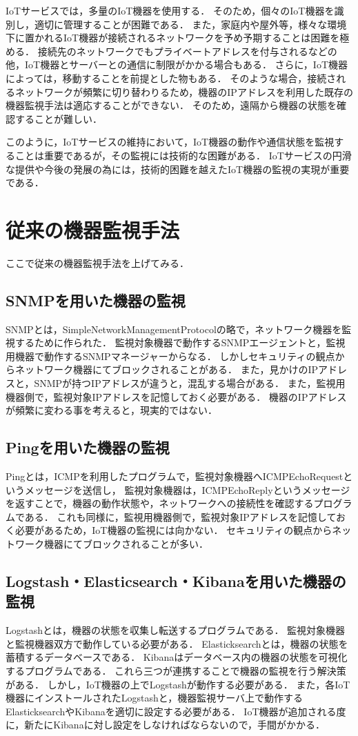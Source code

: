 IoTサービスでは，多量のIoT機器を使用する．
そのため，個々のIoT機器を識別し，適切に管理することが困難である．
また，家庭内や屋外等，様々な環境下に置かれるIoT機器が接続されるネットワークを予め予期することは困難を極める．
接続先のネットワークでもプライベートアドレスを付与されるなどの他，IoT機器とサーバーとの通信に制限がかかる場合もある．
さらに，IoT機器によっては，移動することを前提とした物もある．
そのような場合，接続されるネットワークが頻繁に切り替わりるため，機器のIPアドレスを利用した既存の機器監視手法は適応することができない．
そのため，遠隔から機器の状態を確認することが難しい．
\medskip

このように，IoTサービスの維持において，IoT機器の動作や通信状態を監視することは重要であるが，その監視には技術的な困難がある．
IoTサービスの円滑な提供や今後の発展の為には，技術的困難を越えたIoT機器の監視の実現が重要である．


\section{従来の機器監視手法}
ここで従来の機器監視手法を上げてみる．
\subsection{SNMPを用いた機器の監視}
	SNMPとは，SimpleNetworkManagementProtocolの略で，ネットワーク機器を監視するために作られた．
	監視対象機器で動作するSNMPエージェントと，監視用機器で動作するSNMPマネージャーからなる．
	しかしセキュリティの観点からネットワーク機器にてブロックされることがある．
	また，見かけのIPアドレスと，SNMPが持つIPアドレスが違うと，混乱する場合がある．
	また，監視用機器側で，監視対象IPアドレスを記憶しておく必要がある．
	機器のIPアドレスが頻繁に変わる事を考えると，現実的ではない．
\subsection{Pingを用いた機器の監視}
	Pingとは，ICMPを利用したプログラムで，監視対象機器へICMPEchoRequestというメッセージを送信し，
	監視対象機器は，ICMPEchoReplyというメッセージを返すことで，機器の動作状態や，ネットワークへの接続性を確認するプログラムである．
	これも同様に，監視用機器側で，監視対象IPアドレスを記憶しておく必要があるため，IoT機器の監視には向かない．
	セキュリティの観点からネットワーク機器にてブロックされることが多い．
\subsection{Logstash・Elasticsearch・Kibanaを用いた機器の監視}
	Logstashとは，機器の状態を収集し転送するプログラムである．
	監視対象機器と監視機器双方で動作している必要がある．
	Elasticksearchとは，機器の状態を蓄積するデータベースである．
	Kibanaはデータベース内の機器の状態を可視化するプログラムである．
	これら三つが連携することで機器の監視を行う解決策がある．
	しかし，IoT機器の上でLogstashが動作する必要がある．
	また，各IoT機器にインストールされたLogstashと，機器監視サーバ上で動作するElasticksearchやKibanaを適切に設定する必要がある．
	IoT機器が追加される度に，新たにKibanaに対し設定をしなければならないので，手間がかかる．
